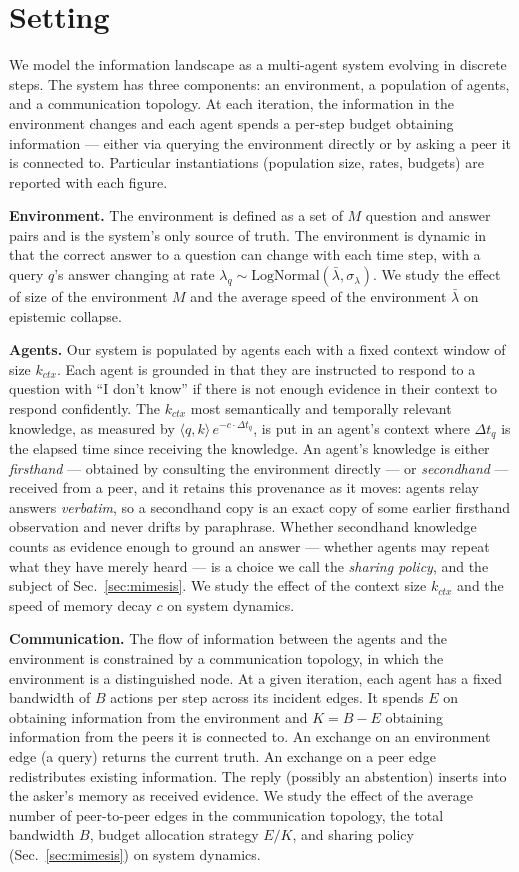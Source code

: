\documentclass[10pt]{article}
\begin{document}
\section{Setting}
We model the information landscape as a multi-agent system evolving in discrete steps.
The system has three components: an environment, a population of agents, and a communication topology.
At each iteration, the information in the environment changes and each agent spends a per-step budget obtaining information --- either via querying the environment directly or by asking a peer it is connected to.
Particular instantiations (population size, rates, budgets) are reported with each figure.

\textbf{Environment.}
The environment is defined as a set of $ M $ question and answer pairs and is the system's only source of truth.
The environment is dynamic in that the correct answer to a question can change with each time step, with a query $ q $'s answer changing at rate $ \lambda_{q} \sim \mathrm{LogNormal}(\bar\lambda, \sigma_{\lambda}) $.
We study the effect of size of the environment $ M $ and the average speed of the environment $ \bar\lambda $ on epistemic collapse.

\textbf{Agents.} Our system is populated by agents each with a fixed context window of size $ k_{ctx} $.
Each agent is grounded in that they are instructed to respond to a question with ``I don't know'' if there is not enough evidence in their context to respond confidently.
The $ k_{ctx} $ most semantically and temporally relevant knowledge, as measured by $\langle q, k \rangle\, e^{-c \cdot \Delta t_{q}}$, is put in an agent's context where $ \Delta t_{q} $ is the elapsed time since receiving the knowledge.
An agent's knowledge is either \emph{firsthand} --- obtained by consulting the environment directly --- or \emph{secondhand} --- received from a peer, and it retains this provenance as it moves: agents relay answers \emph{verbatim}, so a secondhand copy is an exact copy of some earlier firsthand observation and never drifts by paraphrase. Whether secondhand knowledge counts as evidence enough to ground an answer --- whether agents may repeat what they have merely heard --- is a choice we call the \emph{sharing policy}, and the subject of Sec.~\ref{sec:mimesis}.
We study the effect of the context size $ k_{ctx} $ and the speed of memory decay $ c $ on system dynamics.

\textbf{Communication.} The flow of information between the agents and the environment is constrained by a communication topology, in which the environment is a distinguished node.
At a given iteration, each agent has a fixed bandwidth of $B$ actions per step across its incident edges.
It spends $E$ on obtaining information from the environment and $K = B - E$ obtaining information from the peers it is connected to.
An exchange on an environment edge (a query) returns the current truth. An exchange on a peer edge redistributes existing information. The reply (possibly an abstention) inserts into the asker's memory as received evidence.
We study the effect of the average number of peer-to-peer edges in the communication topology, the total bandwidth $ B $, budget allocation strategy $ E / K $, and sharing policy (Sec.~\ref{sec:mimesis}) on system dynamics.
\end{document}
